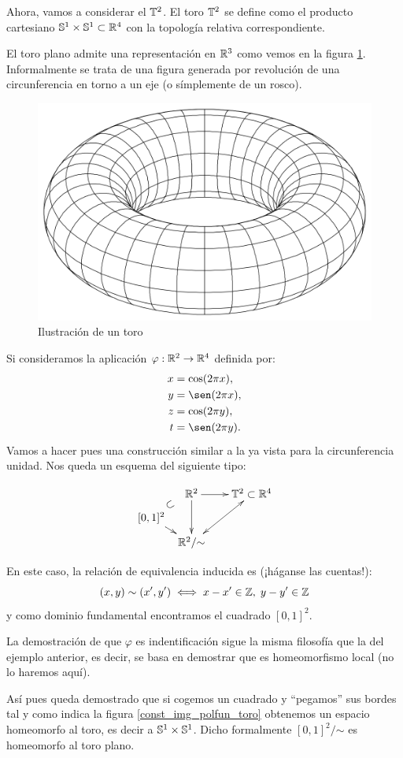 \begin{exa}[Toro]
	Ahora, vamos a considerar el  $\mathbb{T}^2$. El toro $\mathbb{T}^2$ se define como el producto cartesiano $\mathbb{S}^1\times \mathbb{S}^1\subset\mathbb{R}^4$ con la topología relativa correspondiente.
	
	El toro plano admite una representación en $\mathbb{R}^3$ como vemos en la figura \ref{toro}. Informalmente se trata de una figura generada por revolución de una circunferencia en torno a un eje (o símplemente de un rosco).
	
	\begin{figure}[h!]
		\centering
		\includegraphics[scale = 0.15]{img/toro}
		\caption{Ilustración de un toro}
		\label{toro}
	\end{figure}
	Si consideramos la aplicación $\varphi:\mathbb{R}^2\to\mathbb{R}^4$ definida por:
	\[\begin{split}
	x&=\cos(2\pi x),\\
	y&=\sen(2\pi x),\\
	z&=\cos(2\pi y),\\
	t&=\sen(2\pi y).
	\end{split}\]
	Vamos a hacer pues una construcción similar a la ya vista para la circunferencia unidad. Nos queda un esquema del siguiente tipo:
	
	\[\xymatrix @C=0.5pc @R=0.5pc @L=-0.2pc {
		& \R^2\ar[rr] \ar[dd] & &
		\toro^2\subset\R^4 \\
		[0,1]^2 \ar@{}[ur]^*[@]{\subset} \ar[dr] \\
		& \R^2/\mathord{\sim}  \ar@{<->}[rruu]
	}\]
	
	En este caso, la relación de equivalencia inducida es (¡háganse las cuentas!):
	\[(x,y)\sim (x',y')\iff x-x'\in\mathbb{Z},\;y-y'\in\mathbb{Z}\]
	y como dominio fundamental encontramos el cuadrado $[0,1]^2$.
	
	La demostración de que $\varphi$ es indentificación sigue la misma filosofía que la del ejemplo anterior, es decir, se basa en demostrar que es homeomorfismo local (no lo haremos aquí).
	
	Así pues queda demostrado que si cogemos un cuadrado y ``pegamos'' sus bordes tal y como indica la figura \ref{const_img_polfun_toro} obtenemos un espacio homeomorfo al toro, es decir a $\mathbb{S}^1\times \mathbb{S}^1$. Dicho formalmente $[0,1]^2/\mathord{\sim}$ es homeomorfo al toro plano.
	\end{exa}
